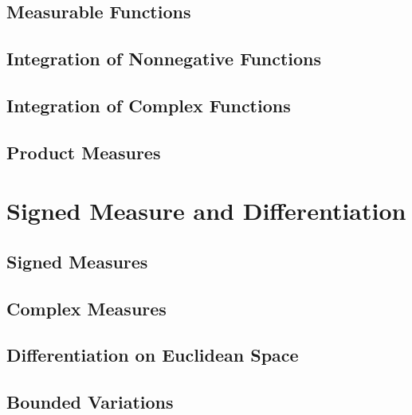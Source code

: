 \section{Measurable Functions}

\section{Integration of Nonnegative Functions}

\section{Integration of Complex Functions}

\section{Product Measures}


\chapter{Signed Measure and Differentiation}

\section{Signed Measures}

\section{Complex Measures}

\section{Differentiation on Euclidean Space}

\section{Bounded Variations}

